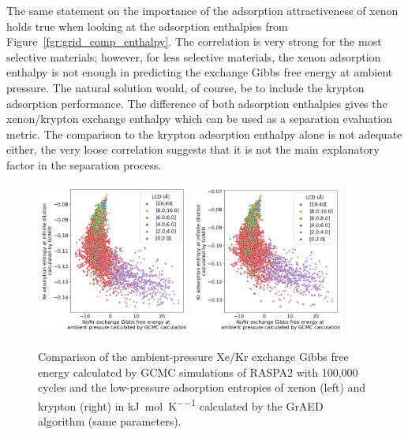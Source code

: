 \documentclass[main]{subfiles}
\begin{document}
The same statement on the importance of the adsorption attractiveness of xenon holds true when looking at the adsorption enthalpies from Figure~\ref{fgr:grid_comp_enthalpy}. The correlation is very strong for the most selective materials; however, for less selective materials, the xenon adsorption enthalpy is not enough in predicting the exchange Gibbs free energy at ambient pressure. The natural solution would, of course, be to include the krypton adsorption performance. The difference of both adsorption enthalpies gives the xenon/krypton exchange enthalpy which can be used as a separation evaluation metric. The comparison to the krypton adsorption enthalpy alone is not adequate either, the very loose correlation suggests that it is not the main explanatory factor in the separation process.

\begin{figure}[ht]
  \centering
    \includegraphics[width=0.45\textwidth]{figures/3-fastsim/G_2080_vs_S_Xe_grid_overview.jpg}
    \includegraphics[width=0.45\textwidth]{figures/3-fastsim/G_2080_vs_S_Kr_grid_overview.jpg}
    \caption{Comparison of the ambient-pressure Xe/Kr exchange Gibbs free energy calculated by GCMC simulations of RASPA2 with 100,000 cycles and the low-pressure adsorption entropies of xenon (left) and krypton (right) in \si{\kilo\joule\per\mole\per\kelvin} calculated by the GrAED algorithm (same parameters).}\label{fgr:grid_comp_entropy}
\end{figure}
\end{document}

